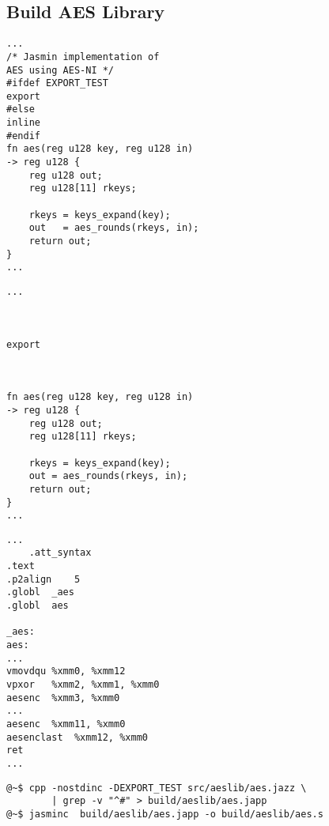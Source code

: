 \subsection{Build AES Library}

\begin{center}

\end{center}
\vfill
\begin{center}
\begin{minipage}{.3\textwidth}
\begin{lstlisting}[style=jasmin, caption={aes.jazz}, captionpos=t]
...
/* Jasmin implementation of 
AES using AES-NI */
#ifdef EXPORT_TEST
export
#else
inline
#endif
fn aes(reg u128 key, reg u128 in) 
-> reg u128 {
	reg u128 out;
	reg u128[11] rkeys;
	
	rkeys = keys_expand(key);
	out   = aes_rounds(rkeys, in);
	return out;
}
...
\end{lstlisting}
\end{minipage}\hfill
\begin{minipage}{.3\textwidth}
\begin{lstlisting}[style=jasmin, caption={aes.japp}, captionpos=t]
...



export



fn aes(reg u128 key, reg u128 in)
-> reg u128 {
	reg u128 out;
	reg u128[11] rkeys;
	
	rkeys = keys_expand(key);
	out = aes_rounds(rkeys, in);
	return out;
}
...
\end{lstlisting}
\end{minipage}\hfill
\begin{minipage}{.3\textwidth}
\begin{lstlisting}[style=jasmin, caption={aes.s}, captionpos=t]
...
	.att_syntax
.text
.p2align	5
.globl	_aes
.globl	aes

_aes:
aes:
...
vmovdqu	%xmm0, %xmm12
vpxor	%xmm2, %xmm1, %xmm0
aesenc	%xmm3, %xmm0
...
aesenc	%xmm11, %xmm0
aesenclast	%xmm12, %xmm0
ret
...
\end{lstlisting}
\end{minipage}
\end{center}
\vfill
\begin{lstlisting}[style=normal]
@~$ cpp -nostdinc -DEXPORT_TEST src/aeslib/aes.jazz \
		| grep -v "^#" > build/aeslib/aes.japp
@~$ jasminc  build/aeslib/aes.japp -o build/aeslib/aes.s
\end{lstlisting}
\newpage
